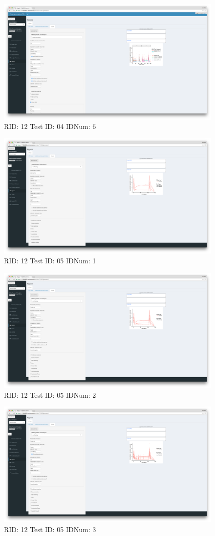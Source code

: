 \begin{figure}[H]
\includegraphics[width=.8\textwidth]{screencaps/12-04-6.png}
\caption{RID: 12 Test ID: 04 IDNum: 6}
\end{figure}
\begin{figure}[H]
\includegraphics[width=.8\textwidth]{screencaps/12-05-1.png}
\caption{RID: 12 Test ID: 05 IDNum: 1}
\end{figure}
\begin{figure}[H]
\includegraphics[width=.8\textwidth]{screencaps/12-05-2.png}
\caption{RID: 12 Test ID: 05 IDNum: 2}
\end{figure}
\begin{figure}[H]
\includegraphics[width=.8\textwidth]{screencaps/12-05-3.png}
\caption{RID: 12 Test ID: 05 IDNum: 3}
\end{figure}
